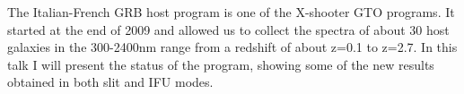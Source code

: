 


\bigskip



\bigskip

\noindent The Italian-French GRB host program is one of the X-shooter GTO programs. It started at the end of 2009 and allowed us to collect the spectra of about 30 host galaxies in the 300-2400nm range from a redshift of about z=0.1 to z=2.7. In this talk I will present the status of the program, showing some of the new results obtained in both slit and IFU modes.


